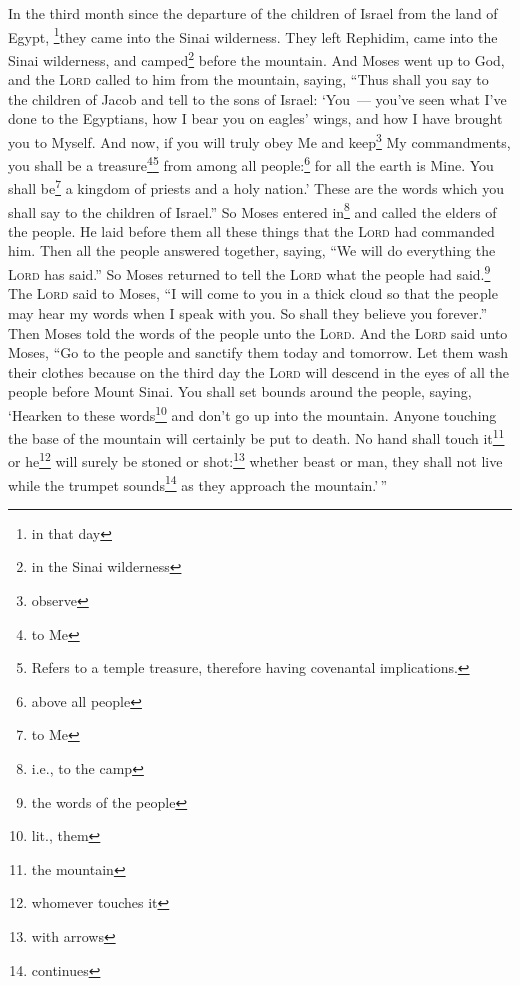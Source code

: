 
\begin{inparaenum}
     In the third month since the departure of the children of Israel from the land of Egypt, \footnote{in that day}they came into the Sinai wilderness.%
     They left Rephidim, came into the Sinai wilderness, and camped\footnote{in the Sinai wilderness} before the mountain.%
     And Moses went up to God, and the \textsc{Lord} called to him from the mountain, saying, ``Thus shall you say to the children of Jacob and tell to the sons of Israel:%
     `You~--- you've seen what I've done to the Egyptians, how I bear you on eagles' wings, and how I have brought you to Myself.%
     And now, if you will truly obey Me and keep\footnote{observe} My commandments, you shall be a treasure\footnote{to Me}\footnote{Refers to a temple treasure, therefore having covenantal implications.} from among all people:\footnote{above all people} for all the earth is Mine.%
     You shall be\footnote{to Me} a kingdom of priests and a holy nation.' These are the words which you shall say to the children of Israel.''%
     So Moses entered in\footnote{i.e., to the camp} and called the elders of the people. He laid before them all these things that the \textsc{Lord} had commanded him.%
     Then all the people answered together, saying, ``We will do everything the \textsc{Lord} has said.'' So Moses returned to tell the \textsc{Lord} what the people had said.\footnote{the words of the people}%
     The \textsc{Lord} said to Moses, ``I will come to you in a thick cloud so that the people may hear my words when I speak with you. So shall they believe you forever.'' Then Moses told the words of the people unto the \textsc{Lord}.%
     And the \textsc{Lord} said unto Moses, ``Go to the people and sanctify them today and tomorrow. Let them wash their clothes%
     because on the third day the \textsc{Lord} will descend in the eyes of all the people before Mount Sinai.%
     You shall set bounds around the people, saying, `Hearken to these words\footnote{lit., them} and don't go up into the mountain. Anyone touching the base of the mountain will certainly be put to death.%
     No hand shall touch it\footnote{the mountain} or he\footnote{whomever touches it} will surely be stoned or shot:\footnote{with arrows} whether beast or man, they shall not live while the trumpet sounds\footnote{continues} as they approach the mountain.'\,''%

\end{inparaenum}
